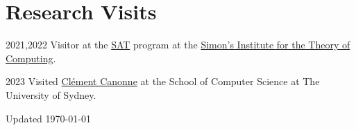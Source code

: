 \documentclass[12pt,letterpaper]{report}
\begin{document}
	\section*{Research Visits}
	\begin{tablist}
		\item[2021,2022]
		Visitor at the \href{https://simons.berkeley.edu/programs/sat2021}{SAT} program at the \href{https://simons.berkeley.edu/}{Simon's Institute for the Theory of Computing}.
		
		\item[2023]
		Visited  \href{https://ccanonne.github.io/}{Clément Canonne} at the School of Computer Science at The University of Sydney.
	\end{tablist}
	
	\begin{center}
		\vfill
		Updated \monthyeardate\today
	\end{center}
	
\end{document}
